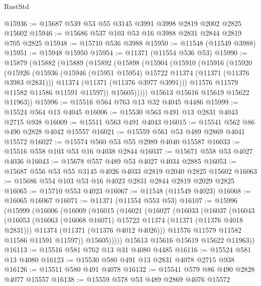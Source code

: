 \begin{lexlean}{RustStd}
\begin{coremodule}
{\begin{coremodule}
{{{{{{{{{{{{{{{{{{{{{{{{{{{{{{{{{@15936 := @15687 @539 @53 @55 @3145 @3991 @3998 @2819 @2002 @2825 @15602
@15946 := @15686 @537 @103 @53 @16 @3988 @2831 @2844 @2819 @705 @2825
@15948 := @15710 @536 @3988
@15950 := @11548 (@11549 @3988)
@15951 := @15948 @15950
@15954 := @11371 (@11554 @536 @53)
@15990 := @15879
    (@15882
      (@15889
        (@15892
          (@15898
            (@15904
              (@15910
                (@15916
                  (@15920
                    (@15926
                      (@15936
                        (@15946 (@15951 @15954) @15722 @11374 (@11371 (@11376 @3983 @2831)))
                        @11374
                        (@11371 (@11376 @3977 @3991)))
                      @11576
                      @11579
                      @11582
                      @11586
                      @11591
                      @11597))
                  @15605)))))
        @15613
        @15616
        @15619
        @15622
        @11963))
@15996 := @15516 @564 @763 @13 @32 @4045 @4486
@15999 := @15524 @564 @13 @4045
@16006 := @15530 @563 @491 @13 @2831 @4043 @2715 @938
@16009 := @15511 @563 @491 @4043
@16015 := @15541 @562 @86 @490 @2828 @4042 @15557
@16021 := @15559 @561 @53 @489 @2869 @4041 @15572
@16027 := @15574 @560 @53 @55 @2989 @4040 @15587
@16033 := @15516 @558 @103 @53 @16 @4038 @2844
@16037 := @15671 @558 @53 @4027 @4036
@16043 := @15678 @557 @489 @53 @4027 @4034 @2885
@16053 := @15687 @556 @53 @55 @3145 @4026 @4033 @2819 @2040 @2825 @15602
@16063 := @15686 @554 @103 @53 @16 @4023 @2831 @2844 @2819 @2029 @2825
@16065 := @15710 @553 @4023
@16067 := @11548 (@11549 @4023)
@16068 := @16065 @16067
@16071 := @11371 (@11554 @553 @53)
@16107 := @15996
    (@15999
      (@16006
        (@16009
          (@16015
            (@16021
              (@16027
                (@16033
                  (@16037
                    (@16043
                      (@16053
                        (@16063 (@16068 @16071) @15722 @11374 (@11371 (@11376 @4018 @2831)))
                        @11374
                        (@11371 (@11376 @4012 @4026)))
                      @11576
                      @11579
                      @11582
                      @11586
                      @11591
                      @11597))
                  @15605)))))
        @15613
        @15616
        @15619
        @15622
        @11963))
@16113 := @15516 @581 @762 @13 @31 @4080 @4485
@16116 := @15524 @581 @13 @4080
@16123 := @15530 @580 @491 @13 @2831 @4078 @2715 @938
@16126 := @15511 @580 @491 @4078
@16132 := @15541 @579 @86 @490 @2828 @4077 @15557
@16138 := @15559 @578 @53 @489 @2869 @4076 @15572
}}}}}}}}}}}}}}}}}}}}}}}}}}}}}}}}}
\end{coremodule}}
\end{coremodule}
\end{lexlean}
